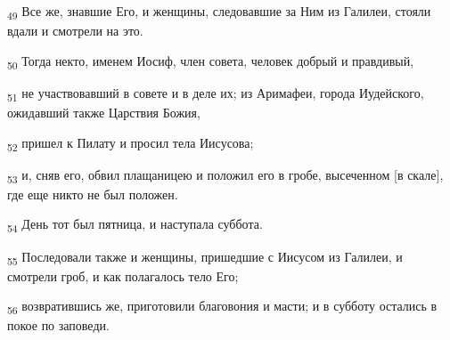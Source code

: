 \begin{tcolorbox}
\textsubscript{49} Все же, знавшие Его, и женщины, следовавшие за Ним из Галилеи, стояли вдали и смотрели на это.
\end{tcolorbox}
\begin{tcolorbox}
\textsubscript{50} Тогда некто, именем Иосиф, член совета, человек добрый и правдивый,
\end{tcolorbox}
\begin{tcolorbox}
\textsubscript{51} не участвовавший в совете и в деле их; из Аримафеи, города Иудейского, ожидавший также Царствия Божия,
\end{tcolorbox}
\begin{tcolorbox}
\textsubscript{52} пришел к Пилату и просил тела Иисусова;
\end{tcolorbox}
\begin{tcolorbox}
\textsubscript{53} и, сняв его, обвил плащаницею и положил его в гробе, высеченном [в скале], где еще никто не был положен.
\end{tcolorbox}
\begin{tcolorbox}
\textsubscript{54} День тот был пятница, и наступала суббота.
\end{tcolorbox}
\begin{tcolorbox}
\textsubscript{55} Последовали также и женщины, пришедшие с Иисусом из Галилеи, и смотрели гроб, и как полагалось тело Его;
\end{tcolorbox}
\begin{tcolorbox}
\textsubscript{56} возвратившись же, приготовили благовония и масти; и в субботу остались в покое по заповеди.
\end{tcolorbox}
